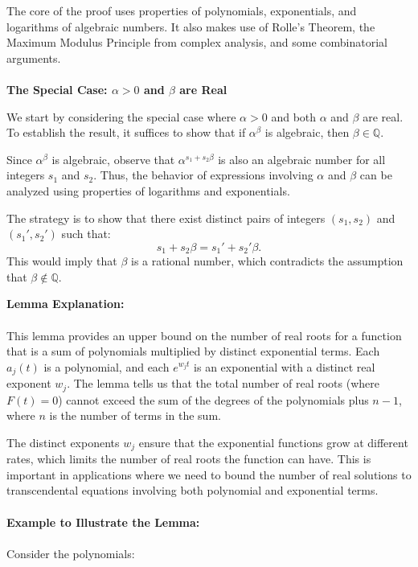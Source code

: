 \documentclass{article}
\begin{document}
The core of the proof uses properties of polynomials, exponentials, and logarithms of algebraic numbers. It also makes use of Rolle's Theorem, the Maximum Modulus Principle from complex analysis, and some combinatorial arguments.\\\\
\textbf{The Special Case: $\alpha > 0$ and $\beta$ are Real}

We start by considering the special case where $\alpha > 0$ and both $\alpha$ and $\beta$ are real. To establish the result, it suffices to show that if $\alpha^\beta$ is algebraic, then $\beta \in \mathbb{Q}$.

Since $\alpha^\beta$ is algebraic, observe that $\alpha^{s_1 + s_2 \beta}$ is also an algebraic number for all integers $s_1$ and $s_2$. Thus, the behavior of expressions involving $\alpha$ and $\beta$ can be analyzed using properties of logarithms and exponentials.

The strategy is to show that there exist distinct pairs of integers $(s_1, s_2)$ and $(s_1', s_2')$ such that:
\[
s_1 + s_2 \beta = s_1' + s_2' \beta.
\]
This would imply that $\beta$ is a rational number, which contradicts the assumption that $\beta \notin \mathbb{Q}$.

\textbf{Lemma Explanation:}\\\\
This lemma provides an upper bound on the number of real roots for a function that is a sum of polynomials multiplied by distinct exponential terms. Each \( a_j(t) \) is a polynomial, and each \( e^{w_j t} \) is an exponential with a distinct real exponent \( w_j \). The lemma tells us that the total number of real roots (where \( F(t) = 0 \)) cannot exceed the sum of the degrees of the polynomials plus \( n - 1 \), where \( n \) is the number of terms in the sum.

The distinct exponents \( w_j \) ensure that the exponential functions grow at different rates, which limits the number of real roots the function can have. This is important in applications where we need to bound the number of real solutions to transcendental equations involving both polynomial and exponential terms.\\\\
\textbf{Example to Illustrate the Lemma:}\\\\
Consider the polynomials:
\end{document}
